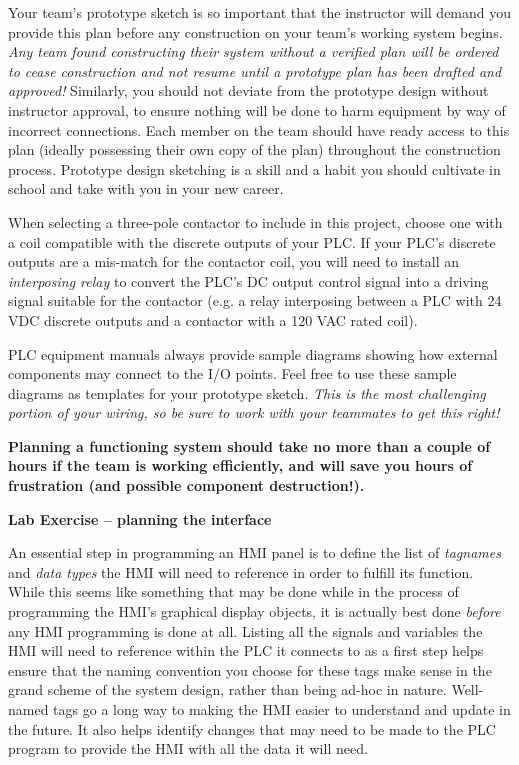 Your team's prototype sketch is so important that the instructor will demand you provide this plan before any construction on your team's working system begins.  {\it Any team found constructing their system without a verified plan will be ordered to cease construction and not resume until a prototype plan has been drafted and approved!}  Similarly, you should not deviate from the prototype design without instructor approval, to ensure nothing will be done to harm equipment by way of incorrect connections.  Each member on the team should have ready access to this plan (ideally possessing their own copy of the plan) throughout the construction process.  Prototype design sketching is a skill and a habit you should cultivate in school and take with you in your new career.

\vskip 10pt

When selecting a three-pole contactor to include in this project, choose one with a coil compatible with the discrete outputs of your PLC.  If your PLC's discrete outputs are a mis-match for the contactor coil, you will need to install an {\it interposing relay} to convert the PLC's DC output control signal into a driving signal suitable for the contactor (e.g. a relay interposing between a PLC with 24 VDC discrete outputs and a contactor with a 120 VAC rated coil).

PLC equipment manuals always provide sample diagrams showing how external components may connect to the I/O points.  Feel free to use these sample diagrams as templates for your prototype sketch.  {\it This is the most challenging portion of your wiring, so be sure to work with your teammates to get this right!}

\vskip 10pt

{\bf Planning a functioning system should take no more than a couple of hours if the team is working efficiently, and will save you hours of frustration (and possible component destruction!).}








\vfil \eject

\noindent
{\bf Lab Exercise -- planning the interface}

\vskip 5pt

An essential step in programming an HMI panel is to define the list of {\it tagnames} and {\it data types} the HMI will need to reference in order to fulfill its function.  While this seems like something that may be done while in the process of programming the HMI's graphical display objects, it is actually best done {\it before} any HMI programming is done at all.  Listing all the signals and variables the HMI will need to reference within the PLC it connects to as a first step helps ensure that the naming convention you choose for these tags make sense in the grand scheme of the system design, rather than being ad-hoc in nature.  Well-named tags go a long way to making the HMI easier to understand and update in the future.  It also helps identify changes that may need to be made to the PLC program to provide the HMI with all the data it will need.

